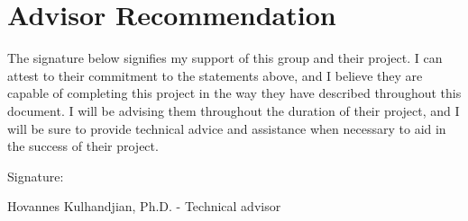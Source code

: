 \documentclass[10pt,onecolumn,draftclsnofoot]{IEEEtran} 					%
\begin{document}
	\section{Advisor Recommendation}
	The signature below signifies my support of this group and their project. I can attest to their commitment to the statements above, and I believe they are capable of completing this project in the way they have described throughout this document. I will be advising them throughout the duration of their project, and I will be sure to provide technical advice and assistance when necessary to aid in the success of their project.\\
	
	\begin{flushleft}
		
	Signature: \hrulefill
	
	\hspace*{0mm}\phantom{Approved: }Hovannes Kulhandjian, Ph.D. - Technical advisor\\\

\end{flushleft}
\end{document}
